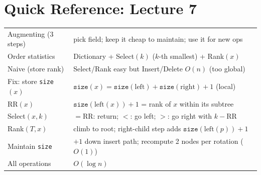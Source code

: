 \documentclass[11pt]{article}
\begin{document}
\section*{\textcolor{violetT}{Quick Reference: Lecture 7}}
\begin{keybox}
\renewcommand{\arraystretch}{1.4}
\begin{tabular}{l l}
Augmenting (3 steps) & pick field; keep it cheap to maintain; use it for new ops\\
Order statistics & Dictionary + Select$(k)$ ($k$-th smallest) + Rank$(x)$\\
Naive (store rank) & Select/Rank easy but Insert/Delete $O(n)$ (too global)\\
Fix: store \texttt{size}$(x)$ & $\texttt{size}(x)=\texttt{size}(\text{left})+\texttt{size}(\text{right})+1$ (local)\\
$\text{RR}(x)$ & $\texttt{size}(\text{left}(x))+1$ = rank of $x$ within its subtree\\
Select$(x,k)$ & $=$RR: return; $<$: go left; $>$: go right with $k-\text{RR}$\\
Rank$(T,x)$ & climb to root; right-child step adds $\texttt{size}(\text{left}(p))+1$\\
Maintain \texttt{size} & $+1$ down insert path; recompute 2 nodes per rotation ($O(1)$)\\
All operations & \textcolor{violetT}{$O(\log n)$}\\
\end{tabular}
\end{keybox}

\vspace{4pt}



%
%
%
%
%
\end{document}
